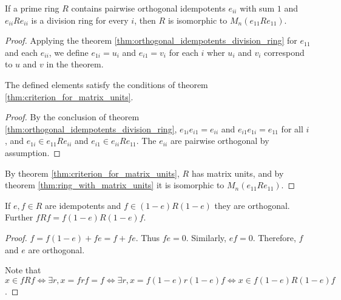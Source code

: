 \begin{theorem}
  \label{thm:orthogonal_idempotents_division_ring_matrix}
  \leanok
  If a prime ring $R$ contains pairwise orthogonal idempotents $e_{ii}$ with sum $1$ and $e_{ii}Re_{ii}$ is a division ring for every $i$, then $R$  is isomorphic to $M_n(e_{11}Re_{11})$.
\end{theorem}
\begin{proof}
  \leanok
  Applying the theorem \ref{thm:orthogonal_idempotents_division_ring} for $e_{11}$ and each $e_{ii}$, we define $e_{1i} = u_i$ and $e_{i1} = v_i$ for each $i$ wher $u_i$ and $v_i$ correspond to $u$ and $v$ in the theorem.
  \begin{claim}
    The defined elements satisfy the conditions of theorem \ref{thm:criterion_for_matrix_units}.
  \end{claim}
  \begin{proof}
    \leanok
    By the conclusion of theorem \ref{thm:orthogonal_idempotents_division_ring}, $e_{1i}e_{i1} = e_{ii}$ and $e_{i1}e_{1i} = e_{11}$ for all $i$, and $e_{1i} \in e_{11}Re_{ii}$ and $e_{i1} \in e_{ii}Re_{11}$. The $e_{ii}$ are pairwise orthogonal by assumption.
  \end{proof}
  By theorem \ref{thm:criterion_for_matrix_units}, $R$ has matrix units, and by theorem \ref{thm:ring_with_matrix_units} it is isomorphic to $M_n(e_{11}Re_{11})$.
\end{proof}

\begin{theorem}
  \label{thm:idempotents_orthogonal}
  \leanok
  If $e, f \in R$ are idempotents and $f \in (1-e)R(1-e)$ they are orthogonal. Further $fRf = f(1 - e) R (1 - e) f$.
\end{theorem}
\begin{proof}
  \leanok
  $f = f(1 - e) + fe = f + fe$. Thus $fe = 0$. Similarly, $ef = 0$. Therefore, $f$ and $e$ are orthogonal.

  Note that $x \in fRf \iff \exists r, x = f r f = f \iff \exists r, x = f(1 - e) r (1 - e) f \iff x \in f(1 - e) R (1 - e) f$.
\end{proof}

